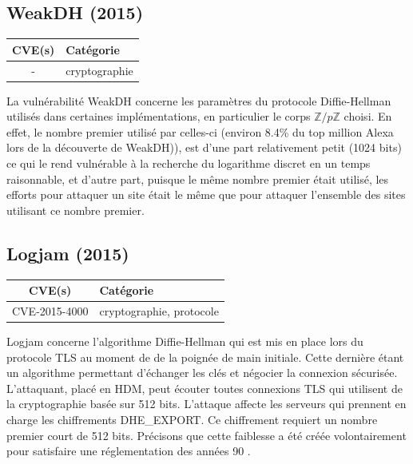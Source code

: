 

\subsection{WeakDH (2015)}

\begin{tabularx}{0.96\textwidth}{|c|X|}
  \hline
  \textbf{CVE(s)} & \textbf{Catégorie} \\
  \hline
  - & cryptographie \\
  \hline
\end{tabularx}

\vspace{1em}

La vulnérabilité WeakDH concerne les paramètres du protocole Diffie-Hellman utilisés dans certaines implémentations, en particulier le corps $\mathbb{Z}/p\mathbb{Z}$ choisi. En effet, le nombre premier utilisé par celles-ci (environ 8.4\% du top million Alexa lors de la découverte de WeakDH)), est d'une part relativement petit (1024 bits) ce qui le rend vulnérable à la recherche du logarithme discret en un temps raisonnable, et d'autre part, puisque le même nombre premier était utilisé, les efforts pour attaquer un site était le même que pour attaquer l'ensemble des sites utilisant ce nombre premier\cite{weakdh}.




\subsection{Logjam (2015)}

\begin{tabularx}{0.96\textwidth}{|c|X|}
  \hline
  \textbf{CVE(s)} & \textbf{Catégorie} \\
  \hline
  CVE-2015-4000 & cryptographie, protocole \\
  \hline
\end{tabularx}

\vspace{1em}

Logjam concerne l'algorithme Diffie-Hellman qui est mis en place lors du protocole TLS au moment de de la poignée de main initiale. Cette dernière étant un algorithme permettant d'échanger les clés et négocier la connexion sécurisée. L'attaquant, placé en HDM, peut écouter toutes connexions TLS qui utilisent de la cryptographie basée sur 512 bits. L'attaque affecte les serveurs qui prennent en charge les chiffrements DHE\_EXPORT. Ce chiffrement requiert un nombre premier court de 512 bits. Précisons que cette faiblesse a été créée volontairement pour satisfaire une réglementation des années 90
\cite{logjam}.


